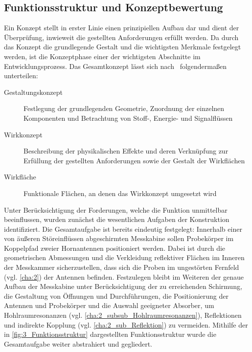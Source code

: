 


\subsection{Funktionsstruktur und Konzeptbewertung}

Ein Konzept stellt in erster Linie einen prinzipiellen Aufbau dar und dient der Überprüfung, inwieweit die gestellten Anforderungen erfüllt werden. Da durch das Konzept die grundlegende Gestalt und die wichtigsten Merkmale festgelegt werden, ist die Konzeptphase einer der wichtigsten Abschnitte im Entwicklungsprozess. Das Gesamtkonzept lässt sich nach~\cite{Pahl_Beitz_Konstruktionslehre} folgendermaßen unterteilen:

\begin{description}
    \item[Gestaltungskonzept] Festlegung der grundlegenden Geometrie, Zuordnung der einzelnen Komponenten und Betrachtung von Stoff-, Energie- und Signalflüssen
    \item[Wirkkonzept] Beschreibung der physikalischen Effekte und deren Verknüpfung zur Erfüllung der \mbox{gestellten} Anforderungen sowie der Gestalt der Wirkflächen
    \item[Wirkfläche] Funktionale Flächen, an denen das Wirkkonzept umgesetzt wird
\end{description}

Unter Berücksichtigung der Forderungen, welche die Funktion unmittelbar beeinflussen, wurden zunächst die wesentlichen Aufgaben der Konstruktion identifiziert. Die Gesamtaufgabe ist bereits eindeutig festgelegt: Innerhalb einer von äußeren Störeinflüssen abgeschirmten Messkabine sollen Probekörper im Koppelpfad zweier Hornantennen positioniert werden. Dabei ist durch die geometrischen Abmessungen und die Verkleidung reflektiver Flächen im Inneren der Messkammer sicherzustellen, dass sich die Proben im ungestörten Fernfeld (vgl. \Kapitel\ref{cha:2}) der Antennen befinden. Festzulegen bleibt im Weiteren der genaue Aufbau der Messkabine unter Berücksichtigung der zu erreichenden Schirmung, die Gestaltung von Öffnungen und Durchführungen, die Positionierung der Antennen und Probekörper und die Auswahl geeigneter Absorber, um Hohlraumresonanzen (vgl. \Abschnitt\ref{cha:2_subsub_Hohlraumresonanzen}), Reflektionen und indirekte Kopplung (vgl. \Abschnitt\ref{cha:2_sub_Reflektion}) zu vermeiden. Mithilfe der in \Abb\ref{fig:3_Funktionsstruktur} dargestellten Funktionsstruktur wurde die Gesamtaufgabe weiter abstrahiert und gegliedert. %

